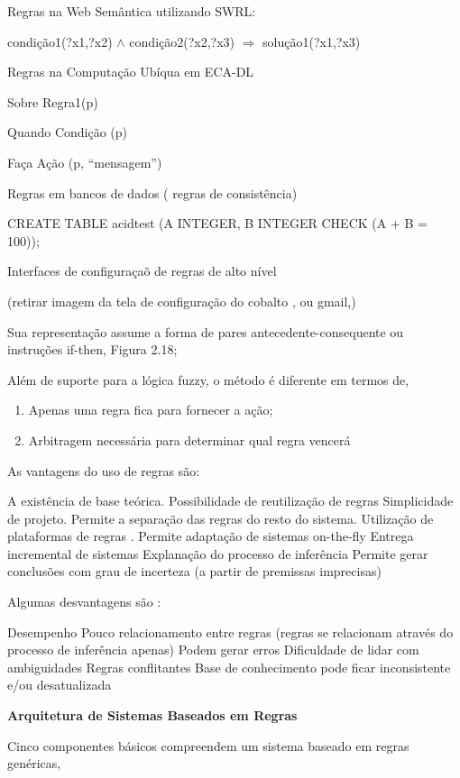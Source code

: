 \documentclass[12pt,a4paper,compsoc]{IEEEtran}
\begin{document}
Regras na Web Semântica utilizando SWRL:

condição1(?x1,?x2) $\wedge$ condição2(?x2,?x3) $\Rightarrow$ solução1(?x1,?x3)

Regras na Computação Ubíqua  em  ECA-DL


Sobre  Regra1(p)

Quando Condição (p)

Faça Ação  (p, “mensagem”)


Regras em bancos de dados ( regras  de consistência)

CREATE TABLE acidtest (A INTEGER, B INTEGER CHECK (A + B = 100));


Interfaces de configuraçaõ de regras de alto nível

(retirar imagem da tela de configuração do cobalto , ou gmail,) 


Sua representação assume a forma de pares antecedente-consequente ou instruções if-then, Figura 2.18;



Além de suporte para a lógica fuzzy, o método é diferente em termos de,

\begin{enumerate}
\item Apenas uma regra fica para fornecer a ação;
\item Arbitragem necessária para determinar qual regra vencerá
\end{enumerate}




As vantagens do uso de regras são:

A existência de base teórica.
Possibilidade de reutilização de regras
Simplicidade de projeto. 
Permite a separação das regras do resto do sistema.
Utilização de plataformas de regras .
Permite adaptação de sistemas on-the-fly
Entrega incremental de sistemas
Explanação do processo de inferência
Permite gerar conclusões com grau de incerteza (a partir de premissas imprecisas)


Algumas desvantagens são :

Desempenho
Pouco relacionamento entre regras (regras se relacionam através do processo de inferência apenas)
Podem gerar erros
Dificuldade de lidar com ambiguidades
Regras conflitantes
Base de conhecimento  pode ficar inconsistente e/ou desatualizada

\textbf{Arquitetura de Sistemas Baseados em Regras}

Cinco componentes básicos compreendem um sistema baseado em regras genéricas,
\end{document}

